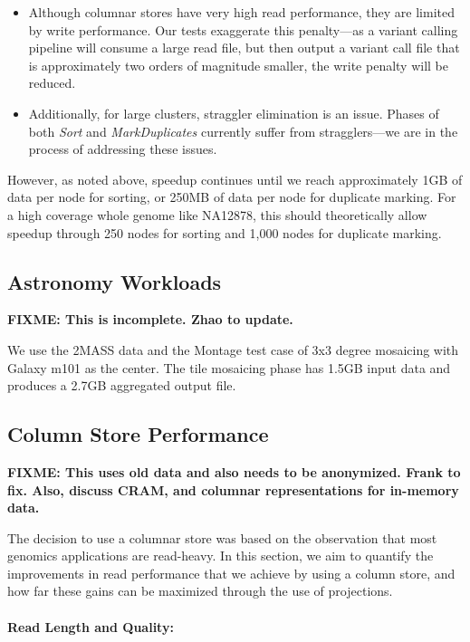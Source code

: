 \documentclass{acm_proc_article-sp}
\begin{document}
\begin{itemize}
\item Although columnar stores have very high read performance, they are limited by write performance.
Our tests exaggerate this penalty---as a variant calling pipeline will consume a large read file, but then
output a variant call file that is approximately two orders of magnitude smaller, the write penalty will be
reduced.
\item Additionally, for large clusters, straggler elimination is an issue. Phases of both \textit{Sort} and
\textit{MarkDuplicates} currently suffer from stragglers---we are in the process of addressing these
issues.
\end{itemize}

However, as noted above, speedup continues until we reach approximately 1GB of data per node for
sorting, or 250MB of data per node for duplicate marking. For a high coverage whole genome like
NA12878, this should theoretically allow speedup through 250 nodes for sorting and 1,000 nodes for
duplicate marking.

\subsection{Astronomy Workloads}
\label{sec:astro-workloads}

\textbf{FIXME: This is incomplete. Zhao to update.}

We use the 2MASS data and the Montage test case of 3x3 degree mosaicing with Galaxy m101 as the
center.  The tile mosaicing phase has 1.5GB input data and produces a 2.7GB aggregated output file.

\subsection{Column Store Performance}
\label{sec:column-store-perf}

\textbf{FIXME: This uses old data and also needs to be anonymized. Frank to fix. Also, discuss CRAM, and columnar representations for in-memory data.}

The decision to use a columnar store was based on the observation that most genomics applications are read-heavy. In this section,
we aim to quantify the improvements in read performance that we achieve by using a column store, and how far these gains can be
maximized through the use of projections.

\paragraph{Read Length and Quality:}
\label{sec:read-length-and-quality}
\end{document}
